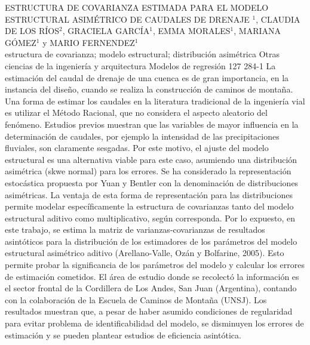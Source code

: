 \A
{ESTRUCTURA DE COVARIANZA ESTIMADA PARA EL MODELO ESTRUCTURAL ASIMÉTRICO DE CAUDALES DE DRENAJE}
{$^1$, CLAUDIA DE LOS RÍOS$^2$, GRACIELA GARCÍA$^1$, EMMA MORALES$^1$, MARIANA GÓMEZ$^1$ y MARIO FERNENDEZ$^1$}
{
\\}
{estructura de covarianza; modelo estructural; distribución asimétrica} 
 {Otras ciencias de la ingeniería y arquitectura} 
 {Modelos de regresión} 
 {127} 
 {284-1}
{La estimación del caudal de drenaje de una cuenca es de gran importancia, en la instancia del diseño, cuando se realiza la construcción de caminos de montaña. Una forma de estimar los caudales en la literatura tradicional de la ingeniería vial es utilizar el Método Racional, que no considera el aspecto aleatorio del fenómeno. Estudios previos muestran que las variables de mayor influencia en la determinación de caudales, por ejemplo la intensidad de las precipitaciones fluviales, son claramente sesgadas. Por este motivo, el ajuste del modelo estructural es una alternativa viable para este caso, asumiendo una distribución asimétrica (skwe normal) para los errores.  Se ha considerado la representación estocástica propuesta por Yuan y Bentler con la denominación de distribuciones asimétricas. La ventaja de esta forma de representación para las distribuciones permite modelar específicamente la estructura de covarianzas tanto del modelo estructural aditivo como multiplicativo, según corresponda. Por lo expuesto, en este trabajo, se estima la matriz de varianzas-covarianzas de resultados asintóticos para la distribución de los estimadores de los parámetros del modelo estructural asimétrico aditivo (Arellano-Valle, Ozán y Bolfarine, 2005). Esto permite probar la significancia de los parámetros del modelo y calcular los errores de estimación cometidos. El área de estudio donde se recolectó la información es el sector frontal de la Cordillera de Los Andes, San Juan (Argentina), contando con la colaboración de la Escuela de Caminos de Montaña (UNSJ). Los resultados muestran que, a pesar de haber asumido condiciones de regularidad para evitar problema de identificabilidad del modelo, se disminuyen los errores de estimación y se pueden plantear estudios de eficiencia asintótica. }
